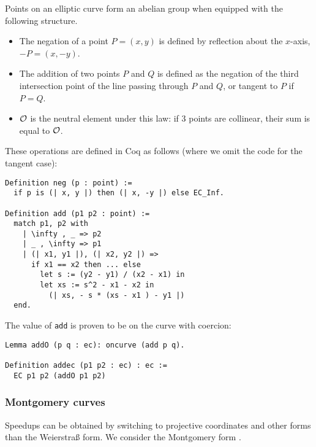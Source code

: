 Points on an elliptic curve form an abelian group when equipped with the following structure.%
\begin{itemize}
  \item The negation of a point $P = (x,y)$ is defined by reflection about the $x$-axis, \ie $-P = (x, -y)$.
  \item The addition of two points $P$ and $Q$ is defined as the negation of the third intersection point
        of the line passing through $P$ and $Q$, or tangent to $P$ if $P = Q$.
  \item $\mathcal{O}$ is the neutral element under this law: if 3 points are collinear, their sum is equal to $\mathcal{O}$.
\end{itemize}
These operations are defined in Coq as follows (where we omit the code for the tangent case):
\begin{lstlisting}[language=Coq]
Definition neg (p : point) :=
  if p is (| x, y |) then (| x, -y |) else EC_Inf.

Definition add (p1 p2 : point) :=
  match p1, p2 with
    | \infty , _ => p2
    | _ , \infty => p1
    | (| x1, y1 |), (| x2, y2 |) =>
      if x1 == x2 then ... else
        let s := (y2 - y1) / (x2 - x1) in
        let xs := s^2 - x1 - x2 in
          (| xs, - s * (xs - x1 ) - y1 |)
  end.
\end{lstlisting}
The value of \texttt{add} is proven to be on the curve with coercion:
\begin{lstlisting}[language=Coq]
Lemma addO (p q : ec): oncurve (add p q).

Definition addec (p1 p2 : ec) : ec :=
  EC p1 p2 (addO p1 p2)
\end{lstlisting}

\subsubsection{Montgomery curves}
\label{subsec:ECC-Montgomery}

Speedups can be obtained by switching to projective coordinates and other forms
than the Weierstra{\ss} form. We consider the Montgomery form \cite{MontgomerySpeeding}.

